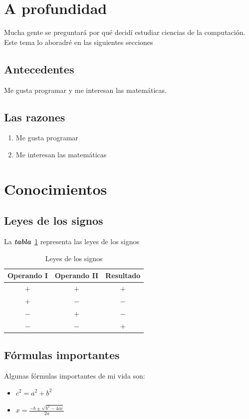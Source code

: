 \section{A profundidad}
Mucha gente se preguntará por qué decidí estudiar ciencias de la
computación. Este tema lo aboradré en las siguientes secciones
\subsection{Antecedentes}
Me gusta programar y me interesan las matemáticas.

\subsection{Las razones}
\begin{enumerate}
\item Me gusta programar
\item Me interesan las matemáticas
\end{enumerate}

\newpage
\section{Conocimientos}
\subsection{Leyes de los signos}
La \emph{\textbf{tabla}}~\ref{tab:signos} representa las leyes de los signos

\begin{table}[h]
  \centering
  \begin{tabular}{ c c c }
    Operando I & Operando II & Resultado\\
    \hline
    $+$ & $+$ & $+$\\
    $+$ & $-$ & $-$\\
    $-$ & $+$ & $-$\\
    $-$ & $-$ & $+$\\
  \end{tabular}
  \caption{Leyes de los signos}
  \label{tab:signos}
\end{table}

\subsection{Fórmulas importantes}
Algunas fórmulas importantes de mi vida son:
\begin{itemize}
\item $c^2 = a^2 + b^2$
\item $x = \frac{-b\pm\sqrt{b^2 - 4ac}}{2a}$
\end{itemize}


